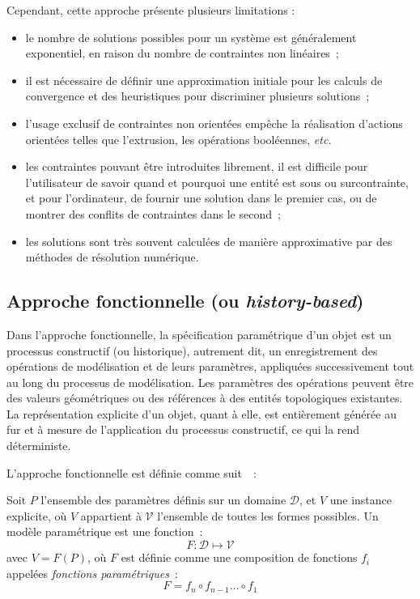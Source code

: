Cependant, cette approche présente plusieurs limitations :
\begin{itemize}
	\item le nombre de solutions possibles pour un système est généralement exponentiel, en raison du nombre de contraintes non linéaires~; %
	\item il est nécessaire de définir une approximation initiale pour les calculs
	      de convergence et des heuristiques pour discriminer plusieurs solutions~;
	\item l'usage exclusif de contraintes non orientées empêche la réalisation
	      d'actions orientées telles que l'extrusion, les opérations booléennes, \textit{etc.}
	\item les contraintes pouvant être introduites librement, il est difficile pour l'utilisateur de savoir quand et pourquoi une entité est sous ou surcontrainte, et pour l'ordinateur, de fournir une solution dans le premier cas, ou de montrer des conflits de contraintes dans le second~;
	\item les solutions sont très souvent calculées de manière approximative par
	      des méthodes de résolution numérique.
\end{itemize}

\subsection{Approche fonctionnelle (ou \textit{history-based})}
\label{sec:etat-art-modelisation-parametric-approche-fonctionnelle}

Dans l'approche fonctionnelle, la spécification paramétrique d'un objet est un processus constructif (ou historique), autrement dit, un enregistrement des opérations de modélisation et de leurs paramètres, appliquées successivement tout au long du processus de modélisation. Les paramètres des opérations peuvent être des valeurs géométriques ou des références à des entités topologiques existantes. La représentation explicite d'un objet, quant à elle, est entièrement générée au fur et à mesure de l'application du processus constructif, ce qui la rend déterministe. %

L'approche fonctionnelle est définie comme suit~\cite{pierra1996general}~: %
\begin{definition}
	Soit $P$ l'ensemble des paramètres définis sur un domaine $\mathcal{D}$, et $V$ une instance explicite, où $V$ appartient à $\mathcal{V}$ l'ensemble de toutes les formes possibles.
	Un modèle paramétrique est une fonction~:
	\[F : \mathcal{D} \mapsto \mathcal{V}\] %
	avec $V = F(P)$, où $F$ est définie comme une composition de
	fonctions $f_{i}$ appelées \emph{fonctions paramétriques}~: \[F = f_{n}\circ f_{n-1} \ldots \circ f_{1}\] %
\end{definition}

